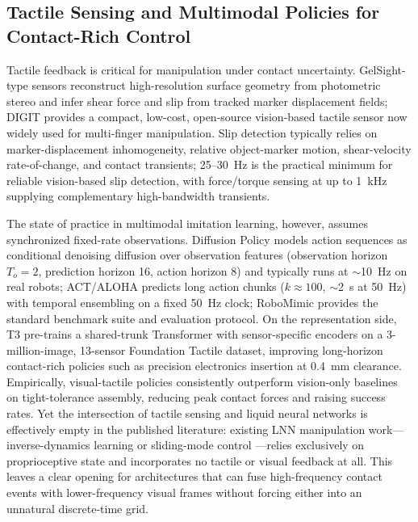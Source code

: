 \documentclass[conference]{IEEEtran}
\begin{document}
\subsection{Tactile Sensing and Multimodal Policies for Contact-Rich Control}
Tactile feedback is critical for manipulation under contact uncertainty. GelSight-type sensors \cite{yuan2017gelsight} reconstruct high-resolution surface geometry from photometric stereo and infer shear force and slip from tracked marker displacement fields; DIGIT \cite{lambeta2020digit} provides a compact, low-cost, open-source vision-based tactile sensor now widely used for multi-finger manipulation. Slip detection typically relies on marker-displacement inhomogeneity, relative object-marker motion, shear-velocity rate-of-change, and contact transients; 25--30~Hz is the practical minimum for reliable vision-based slip detection, with force/torque sensing at up to 1~kHz supplying complementary high-bandwidth transients.

The state of practice in multimodal imitation learning, however, assumes synchronized fixed-rate observations. Diffusion Policy \cite{chi2023diffusion} models action sequences as conditional denoising diffusion over observation features (observation horizon $T_o{=}2$, prediction horizon 16, action horizon 8) and typically runs at $\sim$10~Hz on real robots; ACT/ALOHA \cite{zhao2023act} predicts long action chunks ($k{\approx}100$, $\sim$2~s at 50~Hz) with temporal ensembling on a fixed 50~Hz clock; RoboMimic \cite{robomimic2021} provides the standard benchmark suite and evaluation protocol. On the representation side, T3 \cite{zhao2024t3} pre-trains a shared-trunk Transformer with sensor-specific encoders on a 3-million-image, 13-sensor Foundation Tactile dataset, improving long-horizon contact-rich policies such as precision electronics insertion at 0.4~mm clearance. Empirically, visual-tactile policies consistently outperform vision-only baselines on tight-tolerance assembly, reducing peak contact forces and raising success rates. Yet the intersection of tactile sensing and liquid neural networks is effectively empty in the published literature: existing LNN manipulation work---inverse-dynamics learning \cite{zhang2025invertible} or sliding-mode control \cite{urrea2024smc}---relies exclusively on proprioceptive state and incorporates no tactile or visual feedback at all. This leaves a clear opening for architectures that can fuse high-frequency contact events with lower-frequency visual frames without forcing either into an unnatural discrete-time grid.
\end{document}
